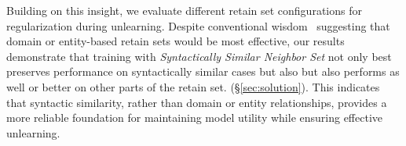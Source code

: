 Building on this insight, we evaluate different retain set configurations for regularization during unlearning. 
Despite conventional wisdom~\citep{choi2024opt} suggesting that domain or entity-based retain sets would be most effective, our results demonstrate that training with \textit{Syntactically Similar Neighbor Set} not only best preserves performance on syntactically similar cases but also but also performs as well or better on other parts of the retain set. (\S\ref{sec:solution}). 
This indicates that syntactic similarity, rather than domain or entity relationships, provides a more reliable foundation for maintaining model utility while ensuring effective unlearning.
